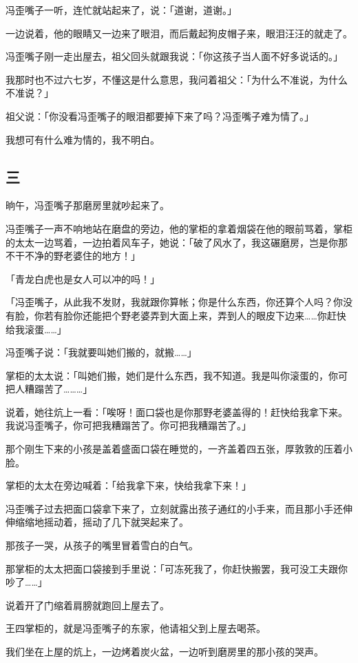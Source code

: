 \documentclass[UTF8]{ctexart}
\begin{document}
冯歪嘴子一听，连忙就站起来了，说：「道谢，道谢。」

一边说着，他的眼睛又一边来了眼泪，而后戴起狗皮帽子来，眼泪汪汪的就走了。

冯歪嘴子刚一走出屋去，祖父回头就跟我说：「你这孩子当人面不好多说话的。」

我那时也不过六七岁，不懂这是什么意思，我问着祖父：「为什么不准说，为什么不准说？」

祖父说：「你没看冯歪嘴子的眼泪都要掉下来了吗？冯歪嘴子难为情了。」

我想可有什么难为情的，我不明白。

\subsection{三}

晌午，冯歪嘴子那磨房里就吵起来了。

冯歪嘴子一声不响地站在磨盘的旁边，他的掌柜的拿着烟袋在他的眼前骂着，掌柜的太太一边骂着，一边拍着风车子，她说：「破了风水了，我这碾磨房，岂是你那不干不净的野老婆住的地方！」

「青龙白虎也是女人可以冲的吗！」

「冯歪嘴子，从此我不发财，我就跟你算帐；你是什么东西，你还算个人吗？你没有脸，你若有脸你还能把个野老婆弄到大面上来，弄到人的眼皮下边来……你赶快给我滚蛋……」

冯歪嘴子说：「我就要叫她们搬的，就搬……」

掌柜的太太说：「叫她们搬，她们是什么东西，我不知道。我是叫你滚蛋的，你可把人糟蹋苦了………」

说着，她往炕上一看：「唉呀！面口袋也是你那野老婆盖得的！赶快给我拿下来。我说冯歪嘴子，你可把我糟蹋苦了。你可把我糟蹋苦了。」

那个刚生下来的小孩是盖着盛面口袋在睡觉的，一齐盖着四五张，厚敦敦的压着小脸。

掌柜的太太在旁边喊着：「给我拿下来，快给我拿下来！」

冯歪嘴子过去把面口袋拿下来了，立刻就露出孩子通红的小手来，而且那小手还伸伸缩缩地摇动着，摇动了几下就哭起来了。

那孩子一哭，从孩子的嘴里冒着雪白的白气。

那掌柜的太太把面口袋接到手里说：「可冻死我了，你赶快搬罢，我可没工夫跟你吵了……」

说着开了门缩着肩膀就跑回上屋去了。

王四掌柜的，就是冯歪嘴子的东家，他请祖父到上屋去喝茶。

我们坐在上屋的炕上，一边烤着炭火盆，一边听到磨房里的那小孩的哭声。
\end{document}
